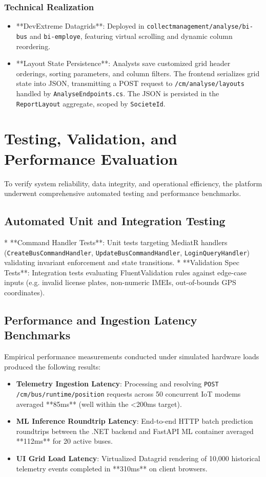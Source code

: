 \subsubsection{Technical Realization}
\begin{itemize}
  \item **DevExtreme Datagrids**: Deployed in \texttt{collectmanagement/analyse/bi-bus} and \texttt{bi-employe}, featuring virtual scrolling and dynamic column reordering.
  \item **Layout State Persistence**: Analysts save customized grid header orderings, sorting parameters, and column filters. The frontend serializes grid state into JSON, transmitting a POST request to \texttt{/cm/analyse/layouts} handled by \texttt{AnalyseEndpoints.cs}. The JSON is persisted in the \texttt{ReportLayout} aggregate, scoped by \texttt{SocieteId}.
\end{itemize}

\section{Testing, Validation, and Performance Evaluation}
\label{sec:impl_testing_benchmarks}

To verify system reliability, data integrity, and operational efficiency, the platform underwent comprehensive automated testing and performance benchmarks.

\subsection{Automated Unit and Integration Testing}
* **Command Handler Tests**: Unit tests targeting MediatR handlers (\texttt{CreateBusCommandHandler}, \texttt{UpdateBusCommandHandler}, \texttt{LoginQueryHandler}) validating invariant enforcement and state transitions.
* **Validation Spec Tests**: Integration tests evaluating FluentValidation rules against edge-case inputs (e.g. invalid license plates, non-numeric IMEIs, out-of-bounds GPS coordinates).

\subsection{Performance and Ingestion Latency Benchmarks}
Empirical performance measurements conducted under simulated hardware loads produced the following results:
\begin{itemize}
  \item \textbf{Telemetry Ingestion Latency}: Processing and resolving \texttt{POST /cm/bus/runtime/position} requests across 50 concurrent IoT modems averaged **85ms** (well within the <200ms target).
  \item \textbf{ML Inference Roundtrip Latency}: End-to-end HTTP batch prediction roundtrips between the .NET backend and FastAPI ML container averaged **112ms** for 20 active buses.
  \item \textbf{UI Grid Load Latency}: Virtualized Datagrid rendering of 10,000 historical telemetry events completed in **310ms** on client browsers.
\end{itemize}

